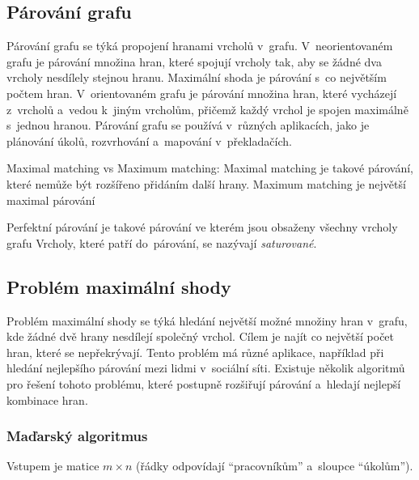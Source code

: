 % 

\subsection{Párování grafu}

Párování grafu se týká propojení hranami vrcholů v~grafu. V~neorientovaném grafu je párování množina hran, které spojují vrcholy tak, aby se 
žádné dva vrcholy nesdílely stejnou hranu. Maximální shoda je párování s~co největším počtem hran. V~orientovaném grafu je párování množina hran, 
které vycházejí z~vrcholů a~vedou k~jiným vrcholům, přičemž každý vrchol je spojen maximálně s~jednou hranou. Párování grafu se používá v~různých 
aplikacích, jako je plánování úkolů, rozvrhování a~mapování v~překladačích.

Maximal matching vs Maximum matching: Maximal matching je takové párování, které nemůže být rozšířeno přidáním další hrany. Maximum matching
je největší maximal párování

Perfektní párování je takové párování ve kterém jsou obsaženy všechny vrcholy grafu
Vrcholy, které patří do~párování, se nazývají \emph{saturované}.


\subsection{Problém maximální shody}

Problém maximální shody se týká hledání největší možné množiny hran v~grafu, kde žádné dvě hrany nesdílejí společný vrchol. Cílem je najít co 
největší počet hran, které se nepřekrývají. Tento problém má různé aplikace, například při hledání nejlepšího párování mezi lidmi v~sociální 
síti. Existuje několik algoritmů pro řešení tohoto problému, které postupně rozšiřují párování a~hledají nejlepší kombinace hran.

\subsubsection{Maďarský algoritmus}

Vstupem je matice $m \times n$ (řádky odpovídají \enquote{pracovníkům} a~sloupce \enquote{úkolům}).

